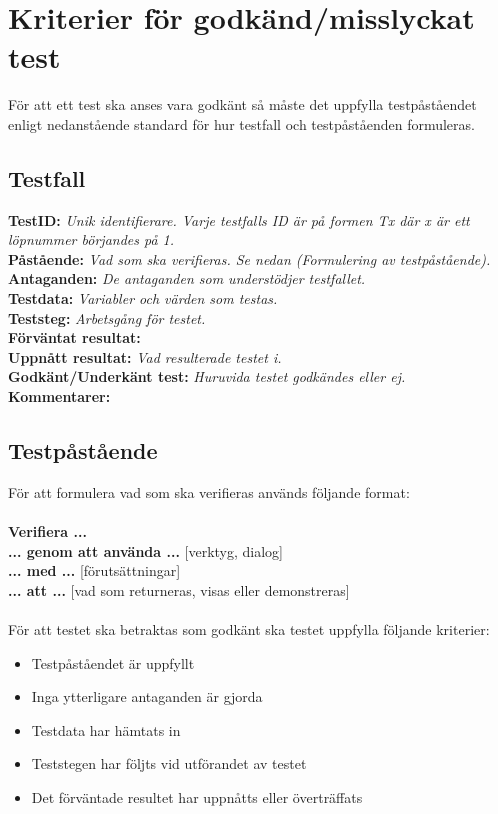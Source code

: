 \section{Kriterier för godkänd/misslyckat test}
För att ett test ska anses vara godkänt så måste det uppfylla testpåståendet enligt nedanstående standard för hur testfall och testpåståenden formuleras.
\subsection*{Testfall}
\textbf{TestID:} \textit{Unik identifierare. Varje testfalls ID är på formen Tx där x är ett löpnummer börjandes på 1.}\\
\textbf{Påstående:} \textit{Vad som ska verifieras. Se nedan (Formulering av testpåstående).}\\
\textbf{Antaganden:} \textit{De antaganden som understödjer testfallet.}\\
\textbf{Testdata: } \textit{Variabler och värden som testas.}\\
\textbf{Teststeg: } \textit{Arbetsgång för testet.}\\
\textbf{Förväntat resultat: } \\
\textbf{Uppnått resultat: } \textit{Vad resulterade testet i.}\\
\textbf{Godkänt/Underkänt test:} \textit{Huruvida testet godkändes eller ej.}\\
\textbf{Kommentarer:} 
\subsection*{Testpåstående}
För att formulera vad som ska verifieras används följande format: \\
\\
\textbf{Verifiera ...} \\
\textbf{... genom att använda ...} [verktyg, dialog] \\
\textbf{... med ...} [förutsättningar] \\
\textbf{... att ...} [vad som returneras, visas eller demonstreras]
\\ \\
För att testet ska betraktas som godkänt ska testet uppfylla följande kriterier:
\begin{itemize}
\item Testpåståendet är uppfyllt
\item Inga ytterligare antaganden är gjorda
\item Testdata har hämtats in
\item Teststegen har följts vid utförandet av testet
\item Det förväntade resultet har uppnåtts eller överträffats
\end{itemize}

